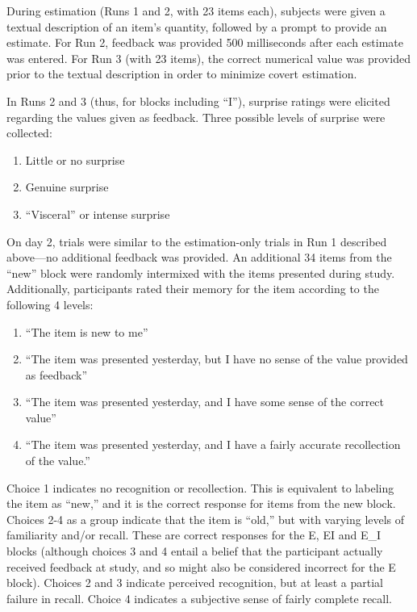 During estimation (Runs 1 and 2, with 23 items each), subjects were given a
textual description of an item's quantity, followed by a prompt to provide an
estimate. For Run 2, feedback was provided 500 milliseconds after each estimate
was entered. For Run 3 (with 23 items), the correct numerical value was provided
prior to the textual description in order to minimize covert estimation.

In Runs 2 and 3 (thus, for blocks including ``I''), surprise ratings were elicited
regarding the values given as feedback. Three possible levels of surprise were
collected: 

\begin{enumerate}
\item Little or no surprise
\item Genuine surprise
\item ``Visceral'' or intense surprise
\end{enumerate}

On day 2, trials were similar to the estimation-only trials in Run 1 described
above---no additional feedback was provided. An additional 34 items from the
``new'' block were randomly intermixed with the items presented during study.
Additionally, participants rated their memory for the item according to the
following 4 levels: 

\begin{enumerate}
\item ``The item is new to me'' 
\item ``The item was presented yesterday, but I have no sense of the value 
provided as feedback'' 
\item ``The item was presented yesterday, and I have some sense of the correct value''
\item ``The item was presented yesterday, and I have a fairly accurate recollection of
the value.'' 
\end{enumerate}

Choice 1 indicates no recognition or recollection.  This is equivalent to
labeling the item as ``new,'' and it is the correct response for items from the
new block.  Choices 2-4 as a group indicate that the item is ``old,'' but with
varying levels of familiarity and/or recall.  These are correct responses for
the E, EI and E\_I blocks (although choices 3 and 4 entail a belief that the
participant actually received feedback at study, and so might also be considered
incorrect for the E block). Choices 2 and 3 indicate perceived recognition, but
at least a partial failure in recall.  Choice 4 indicates a subjective sense of
fairly complete recall.

